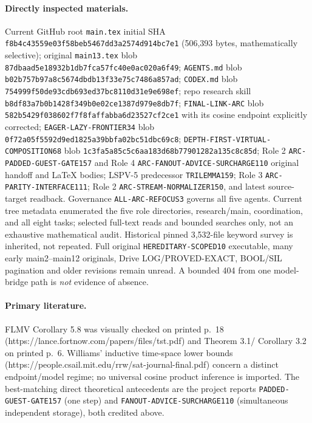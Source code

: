 \documentclass[11pt]{article}
\begin{document}
\paragraph{Directly inspected materials.}
Current GitHub root \texttt{main.tex} initial SHA
\texttt{f8b4c43559e03f58beb5467dd3a2574d914bc7e1} (506,393 bytes,
mathematically selective); original \texttt{main13.tex} blob
\texttt{87dbaad5e18932b1db7fca57fc40e0ac020a6f49};
\texttt{AGENTS.md} blob \texttt{b02b757b97a8c5674dbdb13f33e75c7486a857ad};
\texttt{CODEX.md} blob \texttt{754999f50de93cdb693ed37bc8110d31e9e698ef};
repo research skill \texttt{b8df83a7b0b1428f349b0e02ce1387d979e8db7f};
\texttt{FINAL-LINK-ARC} blob \texttt{582b5429f038602f7f8faffabba6d23527cf2ce1}
with its cosine endpoint explicitly corrected;
\texttt{EAGER-LAZY-FRONTIER34} blob
\texttt{0f72a05f5592d9ed1825a39bbfa02bc51dbc69c8};
\texttt{DEPTH-FIRST-VIRTUAL-COMPOSITION68} blob
\texttt{1c3fa5a85c5c6aa183d68b77901282a135c8c85d};
Role 2 \texttt{ARC-PADDED-GUEST-GATE157} and Role 4
\texttt{ARC-FANOUT-ADVICE-SURCHARGE110} original handoff and LaTeX bodies;
LSPV-5 predecessor \texttt{TRILEMMA159};
Role 3 \texttt{ARC-PARITY-INTERFACE111}; Role 2
\texttt{ARC-STREAM-NORMALIZER150}, and latest source-target readback.
Governance \texttt{ALL-ARC-REFOCUS3} governs all five agents. Current tree
metadata enumerated the five role directories, research/main, coordination,
and all eight tasks; selected full-text reads and bounded searches only,
not an exhaustive mathematical audit. Historical pinned 3,532-file keyword
survey is inherited, not repeated. Full original \texttt{HEREDITARY-SCOPED10}
executable, many early main2--main12 originals, Drive LOG/PROVED-EXACT,
BOOL/SIL pagination and older revisions remain unread. A bounded 404
from one model-bridge path is \emph{not} evidence of absence.

\paragraph{Primary literature.}
FLMV Corollary 5.8 was visually checked on printed p.~18
(https://lance.fortnow.com/papers/files/tst.pdf) and Theorem 3.1/
Corollary 3.2 on printed p.~6. Williams' inductive time-space lower bounds
(https://people.csail.mit.edu/rrw/sat-journal-final.pdf) concern a distinct
endpoint/model regime; no universal cosine product inference is imported.
The best-matching direct theoretical antecedents are the project reports
\texttt{PADDED-GUEST-GATE157} (one step) and
\texttt{FANOUT-ADVICE-SURCHARGE110} (simultaneous independent storage), both
credited above.
\end{document}
